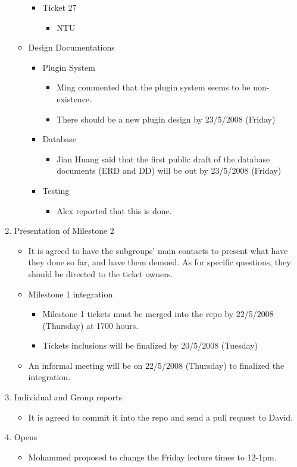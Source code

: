 \documentclass{letter}
\begin{document}
\begin{enumerate}
\begin{itemize}
\begin{itemize}
\begin{itemize}
					\end{itemize}
					\item Ticket 27
					\begin{itemize}
						\item NTU 
					\end{itemize}
			\end{itemize}
		\item Design Documentations
			\begin{itemize}
				\item Plugin System
					\begin{itemize}
						\item Ming commented that the plugin system seems to be non-existence. 
						\item There should be a new plugin design by 23/5/2008 (Friday)
					\end{itemize}
				\item Database
					\begin{itemize}
						\item Jian Huang said that the first public draft of the database documents (ERD and DD) will be out by 23/5/2008 (Friday)
					\end{itemize}
				\item Testing
					\begin{itemize}
						\item Alex reported that this is done. 
					\end{itemize}
			\end{itemize}
	\end{itemize}
\item Presentation of Milestone 2
	\begin{itemize}
		\item It is agreed to have the subgroups' main contacts to present what have they done so far, and have them demoed. As for specific questions, they should be directed to the ticket owners.
		\item Milestone 1 integration
			\begin{itemize}
				\item Milestone 1 tickets must be merged into the repo by 22/5/2008 (Thursday) at 1700 hours.
				\item Tickets inclusions will be finalized by 20/5/2008 (Tuesday)
			\end{itemize}
		\item An informal meeting will be on 22/5/2008 (Thursday) to finalized the integration. 
	\end{itemize}
\item Individual and Group reports
	\begin{itemize}
		\item It is agreed to commit it into the repo and send a pull request to David. 
	\end{itemize}
\item Opens
	\begin{itemize}
		\item Mohammed proposed to change the Friday lecture times to 12-1pm. 
	\end{itemize}
\end{enumerate} 
\end{document}
